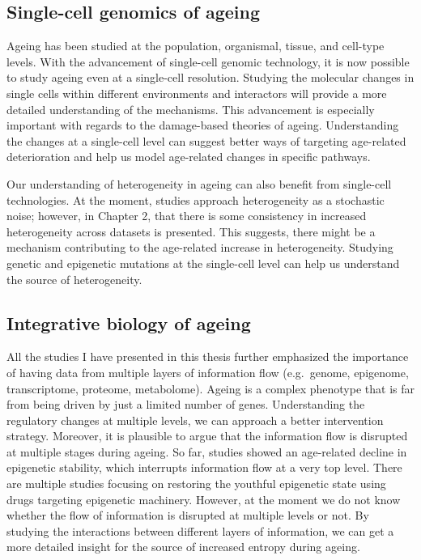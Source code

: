 \documentclass[12pt,twoside]{unicam}
\begin{document}
\hypertarget{single-cell-genomics-of-ageing}{%
\subsection{Single-cell genomics of ageing}\label{single-cell-genomics-of-ageing}}

Ageing has been studied at the population, organismal, tissue, and cell-type levels. With the advancement of single-cell genomic technology, it is now possible to study ageing even at a single-cell resolution. Studying the molecular changes in single cells within different environments and interactors will provide a more detailed understanding of the mechanisms. This advancement is especially important with regards to the damage-based theories of ageing. Understanding the changes at a single-cell level can suggest better ways of targeting age-related deterioration and help us model age-related changes in specific pathways.

Our understanding of heterogeneity in ageing can also benefit from single-cell technologies. At the moment, studies approach heterogeneity as a stochastic noise; however, in Chapter 2, that there is some consistency in increased heterogeneity across datasets is presented. This suggests, there might be a mechanism contributing to the age-related increase in heterogeneity. Studying genetic and epigenetic mutations at the single-cell level can help us understand the source of heterogeneity.

\hypertarget{integrative-biology-of-ageing}{%
\subsection{Integrative biology of ageing}\label{integrative-biology-of-ageing}}

All the studies I have presented in this thesis further emphasized the importance of having data from multiple layers of information flow (e.g.~genome, epigenome, transcriptome, proteome, metabolome). Ageing is a complex phenotype that is far from being driven by just a limited number of genes. Understanding the regulatory changes at multiple levels, we can approach a better intervention strategy. Moreover, it is plausible to argue that the information flow is disrupted at multiple stages during ageing. So far, studies showed an age-related decline in epigenetic stability, which interrupts information flow at a very top level. There are multiple studies focusing on restoring the youthful epigenetic state using drugs targeting epigenetic machinery. However, at the moment we do not know whether the flow of information is disrupted at multiple levels or not. By studying the interactions between different layers of information, we can get a more detailed insight for the source of increased entropy during ageing.
\end{document}
